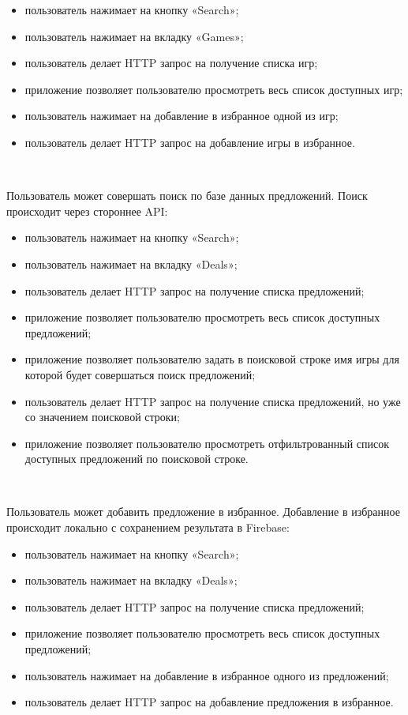 \begin{itemize}
  \item пользователь нажимает на кнопку «Search»;
  \item пользователь нажимает на вкладку «Games»;
  \item пользователь делает HTTP запрос на получение списка игр;
  \item приложение позволяет пользователю просмотреть весь список доступных игр;
  \item пользователь нажимает на добавление в избранное одной из игр;
  \item пользователь делает HTTP запрос на добавление игры в избранное.
\end{itemize}

~\par
Пользователь может совершать поиск по базе данных предложений. Поиск происходит через стороннее API:

\begin{itemize}
  \item пользователь нажимает на кнопку «Search»;
  \item пользователь нажимает на вкладку «Deals»;
  \item пользователь делает HTTP запрос на получение списка предложений;
  \item приложение позволяет пользователю просмотреть весь список доступных предложений;
  \item приложение позволяет пользователю задать в поисковой строке имя игры для которой будет совершаться поиск предложений;
  \item пользователь делает HTTP запрос на получение списка предложений, но уже со значением поисковой строки;
  \item приложение позволяет пользователю просмотреть отфильтрованный список доступных предложений по поисковой строке.
\end{itemize}


~\par

Пользователь может добавить предложение в избранное. Добавление в избранное происходит локально с сохранением результата в Firebase:

\begin{itemize}
  \item пользователь нажимает на кнопку «Search»;
  \item пользователь нажимает на вкладку «Deals»;
  \item пользователь делает HTTP запрос на получение списка предложений;
  \item приложение позволяет пользователю просмотреть весь список доступных предложений;
  \item пользователь нажимает на добавление в избранное одного из предложений;
  \item пользователь делает HTTP запрос на добавление предложения в избранное.
\end{itemize}


